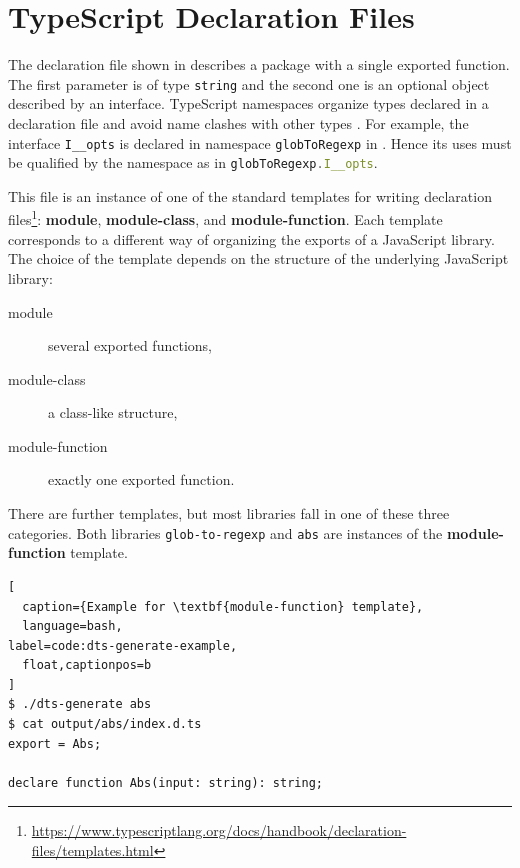 \documentclass[sigconf]{acmart}
\begin{document}

\section{TypeScript Declaration Files}
\label{sec:typescr-decl-files}

The declaration file shown in 
describes a package with a single exported function. The first parameter is of type
\texttt{string} and the second one is an optional object described by an interface. TypeScript namespaces
organize types declared in a declaration file and avoid name clashes with other types
\cite{typescript-namespaces}. For example, the interface
\lstinline[language=TypeScript]{I__opts} is declared in namespace
\lstinline[language=TypeScript]{globToRegexp} in
. Hence its uses
must be qualified by the namespace as in
\lstinline[language=TypeScript]{globToRegexp.I__opts}.

This file is an instance of one of the standard templates for writing
declaration
files\footnote{\url{https://www.typescriptlang.org/docs/handbook/declaration-files/templates.html}}:
\textbf{module}, \textbf{module-class}, and
\textbf{module-function}. 
Each template corresponds to a different way of organizing the exports
of a JavaScript library. The choice of the template depends on the
structure of the underlying JavaScript library:
\begin{description}
\item[module] several exported functions,
\item[module-class] a class-like structure,
\item[module-function] exactly one exported function.
\end{description}
There are further templates, but most libraries fall in one of these
three categories.
Both libraries \texttt{glob-to-regexp} and \texttt{abs} are instances of the
\textbf{module-function} template.

\begin{lstlisting}[
  caption={Example for \textbf{module-function} template},
  language=bash,
label=code:dts-generate-example,
  float,captionpos=b
]
$ ./dts-generate abs
$ cat output/abs/index.d.ts 
export = Abs;

declare function Abs(input: string): string;
\end{lstlisting}
\end{document}
